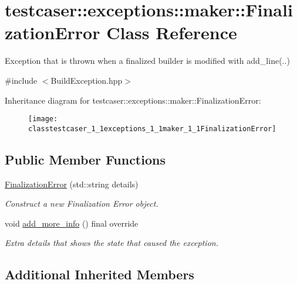 \hypertarget{classtestcaser_1_1exceptions_1_1maker_1_1FinalizationError}{}\section{testcaser\+:\+:exceptions\+:\+:maker\+:\+:Finalization\+Error Class Reference}
\label{classtestcaser_1_1exceptions_1_1maker_1_1FinalizationError}


Exception that is thrown when a finalized builder is modified with add\+\_\+line(..)  




{\ttfamily \#include $<$Build\+Exception.\+hpp$>$}

Inheritance diagram for testcaser\+:\+:exceptions\+:\+:maker\+:\+:Finalization\+Error\+:\begin{figure}[H]
\begin{center}
\leavevmode
\texttt{[image: classtestcaser\_1\_1exceptions\_1\_1maker\_1\_1FinalizationError]}
\end{center}
\end{figure}
\subsection*{Public Member Functions}
\begin{DoxyCompactItemize}
\item 
\mbox{\hyperlink{classtestcaser_1_1exceptions_1_1maker_1_1FinalizationError_a0f878eb50c25b123675bc01eb66fd3bd}{Finalization\+Error}} (std\+::string details)
\begin{DoxyCompactList}\small\item\em Construct a new Finalization Error object. \end{DoxyCompactList}\item 
void \mbox{\hyperlink{classtestcaser_1_1exceptions_1_1maker_1_1FinalizationError_a2e0aee4c53427abcbbcf3d5704687d76}{add\+\_\+more\+\_\+info}} () final override
\begin{DoxyCompactList}\small\item\em Extra details that shows the state that caused the exception. \end{DoxyCompactList}\end{DoxyCompactItemize}
\subsection*{Additional Inherited Members}


